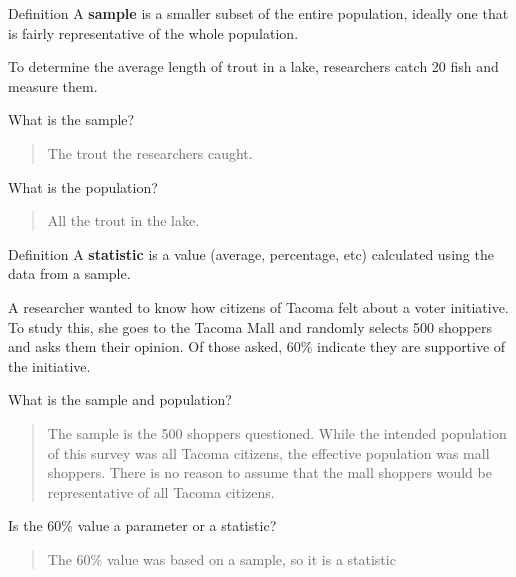 \documentclass{beamer}
\begin{document}
\begin{frame}
\begin{block}{Definition}
A \textbf{sample} is a smaller subset of the entire population, ideally one that is fairly representative of the whole population.
\end{block}\pause

\begin{example}
To determine the average length of trout in a lake, researchers catch 20 fish and measure them. 

\vspace{2mm}
What is the sample?\pause 

\begin{quote}The trout the researchers caught.\end{quote}\pause

What is the population?\pause 

\begin{quote}All the trout in the lake.\end{quote}
\end{example}
\end{frame}

\begin{frame}
\begin{block}{Definition}
A \textbf{statistic} is a value (average, percentage, etc) calculated using the data from a sample.
\end{block} \pause

\begin{example}
A researcher wanted to know how citizens of Tacoma felt about a voter initiative. To study this, she goes to the Tacoma Mall and randomly selects 500 shoppers and asks them their opinion. Of those asked, 60\% indicate they are supportive of the initiative. 

\vspace{2mm}
What is the sample and population? \pause

\begin{quote}
The sample is the 500 shoppers questioned. While the intended population of this survey was all Tacoma citizens, the effective population was mall shoppers. There is no reason to assume that the mall shoppers would be representative of all Tacoma citizens.
\end{quote}\pause

Is the 60\% value a parameter or a statistic?\pause

\begin{quote}
The 60\% value was based on a sample, so it is a statistic
\end{quote}
\end{example}
\end{frame}
\end{document}
